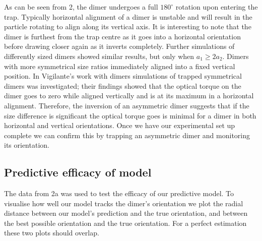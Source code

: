 \documentclass[review,3p]{elsarticle}
\begin{document}
As can be seen from \figurename{ 2}, the dimer undergoes a full $180^{\circ}$ rotation upon entering the trap. Typically horizontal alignment of a dimer is unstable and will result in the particle rotating to align along its vertical axis. It is interesting to note that the dimer is furthest from the trap centre as it goes into a horizontal orientation before drawing closer again as it inverts completely. Further simulations of differently sized dimers showed similar results, but only when $a_1 \geq 2a_2$. Dimers with more symmetrical size ratios immediately aligned into a fixed vertical position. 
In Vigilante's work with dimers \cite{Brownian_OT} simulations of trapped symmetrical dimers was investigated; their findings showed that the optical torque on the dimer goes to zero while aligned vertically and is at its maximum in a horizontal alignment. Therefore, the inversion of an asymmetric dimer suggests that if the size difference is significant the optical torque goes is minimal for a dimer in both horizontal and vertical orientations. Once we have our experimental set up complete we can confirm this by trapping an asymmetric dimer and monitoring its orientation. 

\subsection{Predictive efficacy of model}
\label{3.2}
The data from \figurename{ 2a} was used to test the efficacy of our predictive model. To visualise how well our model tracks the dimer's orientation we plot the radial distance between our model's prediction and the true orientation, and between the best possible orientation and the true orientation. For a perfect estimation these two plots should overlap. 
\end{document}
